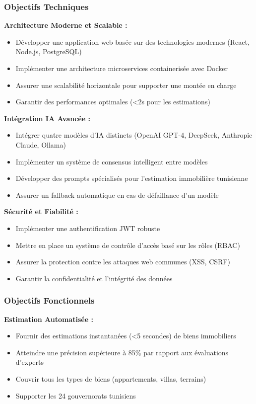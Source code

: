 \subsubsection{Objectifs Techniques}

\textbf{Architecture Moderne et Scalable :}
\begin{itemize}
    \item Développer une application web basée sur des technologies modernes (React, Node.js, PostgreSQL)
    \item Implémenter une architecture microservices containerisée avec Docker
    \item Assurer une scalabilité horizontale pour supporter une montée en charge
    \item Garantir des performances optimales (<2s pour les estimations)
\end{itemize}

\textbf{Intégration IA Avancée :}
\begin{itemize}
    \item Intégrer quatre modèles d'IA distincts (OpenAI GPT-4, DeepSeek, Anthropic Claude, Ollama)
    \item Implémenter un système de consensus intelligent entre modèles
    \item Développer des prompts spécialisés pour l'estimation immobilière tunisienne
    \item Assurer un fallback automatique en cas de défaillance d'un modèle
\end{itemize}

\textbf{Sécurité et Fiabilité :}
\begin{itemize}
    \item Implémenter une authentification JWT robuste
    \item Mettre en place un système de contrôle d'accès basé sur les rôles (RBAC)
    \item Assurer la protection contre les attaques web communes (XSS, CSRF)
    \item Garantir la confidentialité et l'intégrité des données
\end{itemize}

\subsubsection{Objectifs Fonctionnels}

\textbf{Estimation Automatisée :}
\begin{itemize}
    \item Fournir des estimations instantanées (<5 secondes) de biens immobiliers
    \item Atteindre une précision supérieure à 85\% par rapport aux évaluations d'experts
    \item Couvrir tous les types de biens (appartements, villas, terrains)
    \item Supporter les 24 gouvernorats tunisiens
\end{itemize}

